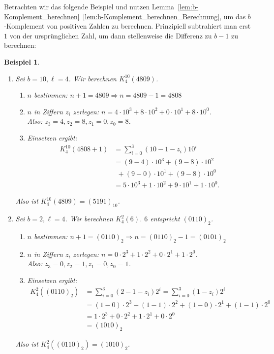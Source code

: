 \documentclass{article}
\newtheorem{beispiel}[satz]{Beispiel}
\begin{document}
  \vspace{\baselineskip}
  Betrachten wir das folgende Beispiel und nutzen Lemma~\ref{lem:b-Komplement_berechnen}~\ref{lem:b-Komplement_berechnen_Berechnung}, um das $b$-Komplement von positiven Zahlen zu berechnen.
  Prinzipiell subtrahiert man erst $1$ von der ursprünglichen Zahl, um dann stellenweise die Differenz zu $b-1$ zu berechnen:

  \begin{beispiel}
    \begin{enumerate}
      \item Sei $b=10, \ell=4$. Wir berechnen $K_4^{10}(4809)$.
        \begin{enumerate}
          \item $n$ bestimmen: $n+1 = 4809 \Rightarrow n = 4809 -1 = 4808$
          \item $n$ in Ziffern $z_i$ zerlegen: $n=4 \cdot 10^3 + 8 \cdot 10^2 + 0\cdot 10^1 + 8\cdot 10^0$. \\
           Also: $z_3 = 4, z_2 = 8, z_1 = 0, z_0 =8$.
          \item Einsetzen ergibt:
            \begin{align*}
              K_4^{10}(4808+1) &= \sum_{i=0}^3(10-1-z_i)10^i \\
              &= (9-4) \cdot 10^3 + (9-8) \cdot 10^2 \\ 
              &~~+ (9-0) \cdot 10^1 + (9-8) \cdot 10^0 \\
              &= 5 \cdot 10^3 + 1 \cdot 10^2 + 9 \cdot 10^1 + 1 \cdot 10^0.
            \end{align*}
        \end{enumerate}
        Also ist $K_4^{10}(4809)=(5191)_{10}$.
      \item Sei $b=2, \ell=4$. Wir berechnen $K_4^2(6)$. $6$ entspricht $(0110)_2$.
        \begin{enumerate}
          \item $n$ bestimmen: $n+1 = (0110)_2 \Rightarrow n = (0110)_2 -1 = (0101)_2$
          \item $n$ in Ziffern $z_i$ zerlegen: $n=0 \cdot 2^3 + 1 \cdot 2^2 + 0\cdot 2^1 + 1\cdot 2^0$. \\
           Also: $z_3 = 0, z_2 = 1, z_1 = 0, z_0 =1$.
          \item Einsetzen ergibt:
            \begin{align*}
              K_4^2((0110)_2) &= \sum_{i=0}^3(2-1-z_i)2^i = \sum_{i=0}^3(1-z_i)2^i \\
              &= (1-0) \cdot 2^3 + (1-1) \cdot 2^2 + (1-0) \cdot 2^1 + (1-1) \cdot 2^0 \\
              &= 1 \cdot 2^3 + 0 \cdot 2^2 + 1\cdot 2^1 + 0\cdot 2^0 \\
              &= (1010)_2
            \end{align*}
        \end{enumerate}
        Also ist $K_4^2((0110)_2) = (1010)_2$.
    \end{enumerate}
  \end{beispiel}
\end{document}
